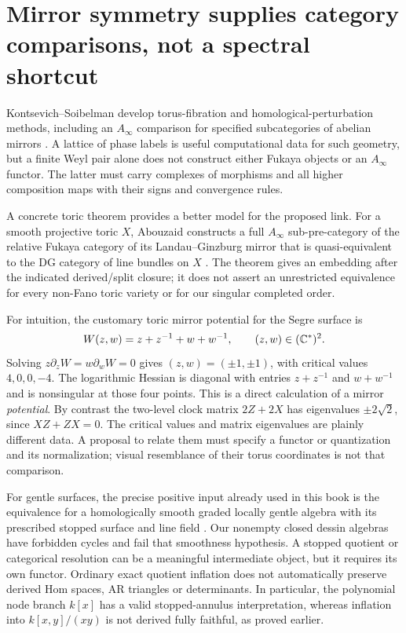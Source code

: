 \section{Mirror symmetry supplies category comparisons, not a spectral shortcut}
Kontsevich--Soibelman develop torus-fibration and homological-perturbation
methods, including an $A_\infty$ comparison for specified subcategories of
abelian mirrors \cite[Sections 6--8, Theorem 4]{TGKontsevichSoibelman}.
A lattice of phase labels is useful computational data for such geometry,
but a finite Weyl pair alone does not construct either Fukaya objects or
an $A_\infty$ functor. The latter must carry complexes of morphisms and
all higher composition maps with their signs and convergence rules.

A concrete toric theorem provides a better model for the proposed link.
For a smooth projective toric $X$, Abouzaid constructs a full
$A_\infty$ sub-pre-category of the relative Fukaya category of its
Landau--Ginzburg mirror that is quasi-equivalent to the DG category of
line bundles on $X$ \cite[Theorem 1.2 and Corollary 1.4]{TGAbouzaid}.
The theorem gives an embedding after the indicated derived/split closure;
it does not assert an unrestricted equivalence for every non-Fano toric
variety or for our singular completed order.

For intuition, the customary toric mirror potential for the Segre surface
is
\[
 W(z,w)=z+z^{-1}+w+w^{-1},\qquad (z,w)\in(\mathbb C^*)^2.
\]
Solving $z\partial_zW=w\partial_wW=0$ gives
$(z,w)=(\pm1,\pm1)$, with critical values $4,0,0,-4$.
The logarithmic Hessian is diagonal with entries $z+z^{-1}$ and
$w+w^{-1}$ and is nonsingular at those four points. This is a direct
calculation of a mirror \emph{potential}. By contrast the two-level clock
matrix $2Z+2X$ has eigenvalues $\pm2\sqrt2$, since $XZ+ZX=0$.
The critical values and matrix eigenvalues are plainly different data.
A proposal to relate them must specify a functor or quantization and its
normalization; visual resemblance of their torus coordinates is not that
comparison.

For gentle surfaces, the precise positive input already used in this
book is the equivalence for a homologically smooth graded locally gentle
algebra with its prescribed stopped surface and line field
\cite[Theorem 3.2.2]{LekiliPolishchuk}. Our nonempty closed dessin algebras
have forbidden cycles and fail that smoothness hypothesis. A stopped
quotient or categorical resolution can be a meaningful intermediate
object, but it requires its own functor. Ordinary exact quotient
inflation does not automatically preserve derived Hom spaces, AR
triangles or determinants. In particular, the polynomial node branch
$k[x]$ has a valid stopped-annulus interpretation, whereas inflation into
$k[x,y]/(xy)$ is not derived fully faithful, as proved earlier.

